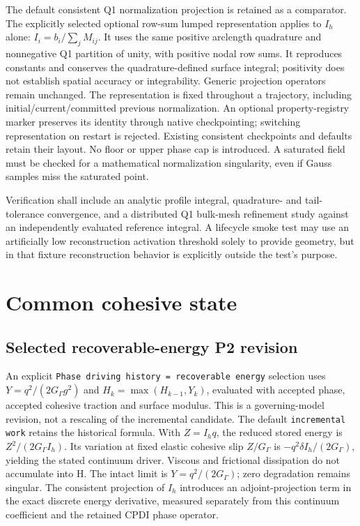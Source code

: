 \documentclass[11pt]{article}
\begin{document}
The default consistent Q1 normalization projection is retained as a comparator.
The explicitly selected optional row-sum lumped representation applies to
$I_h$ alone: $I_i=b_i/\sum_j M_{ij}$. It uses the same positive arclength
quadrature and nonnegative Q1 partition of unity, with positive nodal row sums.
It reproduces constants and conserves the quadrature-defined surface integral;
positivity does not establish spatial accuracy or integrability. Generic
projection operators remain unchanged. The representation is fixed throughout
a trajectory, including initial/current/committed previous normalization.
An optional property-registry marker preserves its identity through native
checkpointing; switching representation on restart is rejected. Existing
consistent checkpoints and defaults retain their layout. No floor or upper
phase cap is introduced. A saturated field must be checked for a mathematical
normalization singularity, even if Gauss samples miss the saturated point.

Verification shall include an analytic profile integral, quadrature- and
tail-tolerance convergence, and a distributed Q1 bulk-mesh refinement study
against an independently evaluated reference integral. A lifecycle smoke test
may use an artificially low reconstruction activation threshold solely to
provide geometry, but in that fixture reconstruction behavior is explicitly
outside the test's purpose.

\section{Common cohesive state}

\subsection{Selected recoverable-energy P2 revision}
An explicit \texttt{Phase driving history = recoverable energy} selection uses
$Y=q^2/(2G_\Gamma g^2)$ and $H_k=\max(H_{k-1},Y_k)$, evaluated with accepted
phase, accepted cohesive traction and surface modulus. This is a governing-model
revision, not a rescaling of the incremental candidate. The default
\texttt{incremental work} retains the historical formula. With $Z=I_hq$, the
reduced stored energy is $Z^2/(2G_\Gamma I_h)$. Its variation at fixed elastic
cohesive slip $Z/G_\Gamma$ is $-q^2\delta I_h/(2G_\Gamma)$, yielding the stated
continuum driver. Viscous and frictional dissipation do not accumulate into H.
The intact limit is $Y=q^2/(2G_\Gamma)$; zero degradation remains singular.
The consistent projection of $I_h$ introduces an adjoint-projection term in the
exact discrete energy derivative, measured separately from this continuum
coefficient and the retained CPDI phase operator.
\end{document}
